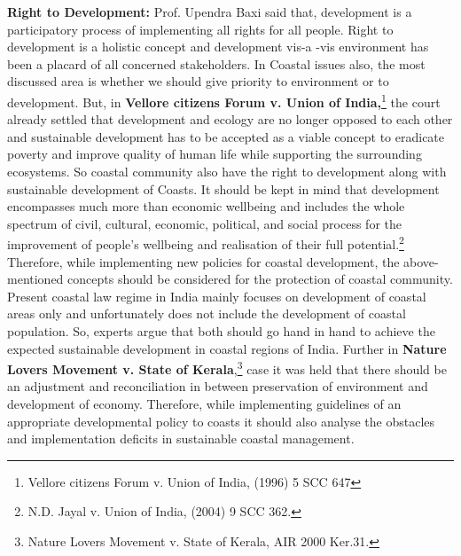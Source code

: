 \begin{multicols}{2}
\noi
{\large\bfseries Right to Development:} Prof. Upendra Baxi said that, development is a
participatory process of implementing all rights for all people. Right to development is a
holistic concept and development vis-a -vis environment has been a placard of all concerned
stakeholders. In Coastal issues also, the most discussed area is whether we should give
priority to environment or to development. But, in \textbf{Vellore citizens Forum v. Union of
India,}\footnote{Vellore citizens Forum v. Union of India, (1996) 5 SCC 647} the court already settled that development and ecology are no longer opposed to
each other and sustainable development has to be accepted as a viable concept to eradicate
poverty and improve quality of human life while supporting the surrounding ecosystems. So
coastal community also have the right to development along with sustainable development of
Coasts. It should be kept in mind that development encompasses much more than economic
wellbeing and includes the whole spectrum of civil, cultural, economic, political, and social
process for the improvement of people’s wellbeing and realisation of their full potential.\footnote{N.D. Jayal v. Union of India, (2004) 9 SCC 362.}
Therefore, while implementing new policies for coastal development, the above-mentioned
concepts should be considered for the protection of coastal community. Present coastal law
regime in India mainly focuses on development of coastal areas only and unfortunately does
not include the development of coastal population. So, experts argue that both should go hand
in hand to achieve the expected sustainable development in coastal regions of India. Further
in \textbf{Nature Lovers Movement v. State of Kerala},\footnote{Nature Lovers Movement v. State of Kerala, AIR 2000 Ker.31.} case it was held that there should be an
adjustment and reconciliation in between preservation of environment and development of 
economy. Therefore, while implementing guidelines of an appropriate developmental policy
to coasts it should also analyse the obstacles and implementation deficits in sustainable
coastal management.


\end{multicols}
